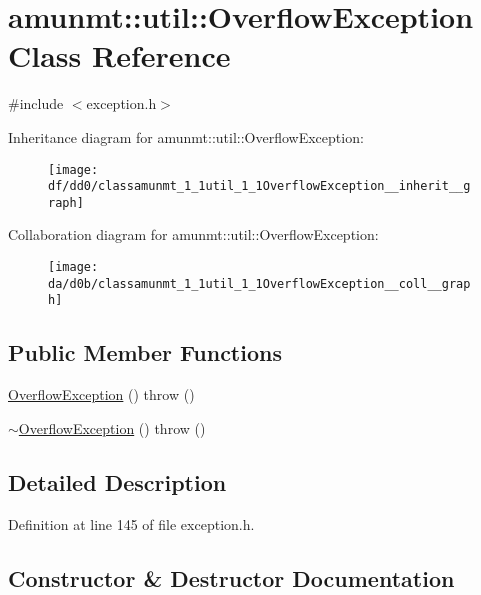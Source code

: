 \hypertarget{classamunmt_1_1util_1_1OverflowException}{}\section{amunmt\+:\+:util\+:\+:Overflow\+Exception Class Reference}
\label{classamunmt_1_1util_1_1OverflowException}


{\ttfamily \#include $<$exception.\+h$>$}



Inheritance diagram for amunmt\+:\+:util\+:\+:Overflow\+Exception\+:
\nopagebreak
\begin{figure}[H]
\begin{center}
\leavevmode
\texttt{[image: df/dd0/classamunmt\_1\_1util\_1\_1OverflowException\_\_inherit\_\_graph]}
\end{center}
\end{figure}


Collaboration diagram for amunmt\+:\+:util\+:\+:Overflow\+Exception\+:
\nopagebreak
\begin{figure}[H]
\begin{center}
\leavevmode
\texttt{[image: da/d0b/classamunmt\_1\_1util\_1\_1OverflowException\_\_coll\_\_graph]}
\end{center}
\end{figure}
\subsection*{Public Member Functions}
\begin{DoxyCompactItemize}
\item 
\hyperlink{classamunmt_1_1util_1_1OverflowException_ae366992ee386c907befe86691309a36e}{Overflow\+Exception} ()  throw ()
\item 
\hyperlink{classamunmt_1_1util_1_1OverflowException_a8cb176b8fc66297a0d2a08eab0818517}{$\sim$\+Overflow\+Exception} ()  throw ()
\end{DoxyCompactItemize}


\subsection{Detailed Description}


Definition at line 145 of file exception.\+h.



\subsection{Constructor \& Destructor Documentation}
